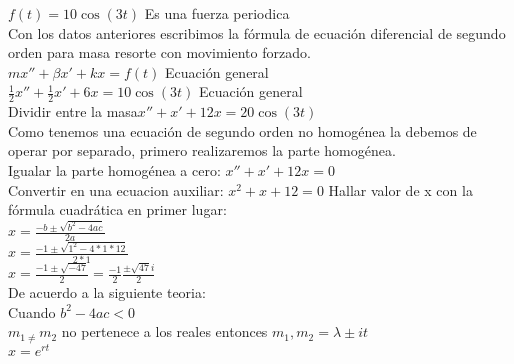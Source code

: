 \documentclass[12pt,a4paper]{article}
\begin{document}
\vspace{0.2cm}
$f(t)=10\cos(3t)$\hspace{0.5cm} Es una fuerza periodica\\

Con los datos anteriores escribimos la fórmula de ecuación diferencial de segundo orden para masa resorte con movimiento forzado. \\

\vspace{0.2cm}
$mx''+\beta x'+kx=f(t)$\hspace{0.5cm} Ecuación general\\

\vspace{0.2cm}
$\frac{1}{2}x''+\frac{1}{2}x'+6x=10\cos(3t)$\hspace{0.5cm} Ecuación general\\

\vspace{0.2cm}
Dividir entre la masa\hspace{0.5cm}$x''+x'+12x=20\cos(3t)$\\

Como tenemos una ecuación de segundo orden no homogénea la debemos de operar por separado, primero realizaremos la parte homogénea. \\

Igualar la parte homogénea a cero: $x''+x'+12x=0$\\

Convertir en una ecuacion auxiliar: $x^2+x+12=0$\hspace{0.5cm}  Hallar valor de x con  la fórmula cuadrática en primer lugar:\\

 $x = \frac {-b \pm \sqrt {b^2 - 4ac}}{2a}$\\

$x = \frac {-1 \pm \sqrt {1^2 - 4*1*12}}{2*1}$\\

$x = \frac {-1 \pm \sqrt {-47}}{2}=\frac{-1}{2}\frac{\pm\sqrt{47}i}{2}$\\

De acuerdo a la siguiente teoria:\\

Cuando $b^2-4ac<0$\\

$m_{1\neq }m_{2}$ no pertenece a los reales entonces $m_{1 },m_{2}=\lambda \pm it$\\

$x=e^{rt}$\\
\end{document}
